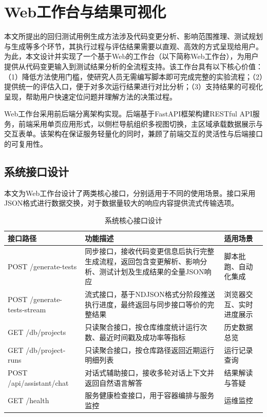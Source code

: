 \section{Web工作台与结果可视化}
\label{sec:web-workbench}

本文所提出的回归测试用例生成方法涉及代码变更分析、影响范围推理、测试规划与生成等多个环节，其执行过程与评估结果需要以直观、高效的方式呈现给用户。为此，本文设计并实现了一个基于Web的工作台（以下简称Web工作台），为用户提供从代码变更输入到测试结果分析的全流程支持。该工作台具有以下核心价值：（1）降低方法使用门槛，使研究人员无需编写脚本即可完成完整的实验流程；（2）提供统一的评估入口，便于对多次运行结果进行对比分析；（3）支持结果的可视化呈现，帮助用户快速定位问题并理解方法的决策过程。

Web工作台采用前后端分离架构实现。后端基于FastAPI框架构建RESTful API服务，前端采用单页应用形式，以侧栏导航组织多视图切换，主区域承载数据展示与交互表单。该架构在保证服务轻量化的同时，兼顾了前端交互的灵活性与后端接口的可复用性。

\subsection{系统接口设计}
\label{sec:interface-design}

本文为Web工作台设计了两类核心接口，分别适用于不同的使用场景。接口采用JSON格式进行数据交换，对于数据量较大的响应内容提供流式传输选项。

\begin{table}[htbp]
\centering
\caption{系统核心接口设计}
\label{tab:api-interfaces}
\begin{tabular}{@{}>{\raggedright\arraybackslash}p{3.6cm}>{\raggedright\arraybackslash}p{5.8cm}>{\raggedright\arraybackslash}p{4.4cm}@{}}
\toprule
接口路径 & 功能描述 & 适用场景 \\
\midrule
POST /generate-tests & 同步接口，接收代码变更信息后执行完整生成流程，返回包含变更解析、影响分析、测试计划及生成结果的全量JSON响应 & 脚本批跑、自动化集成 \\
POST /generate-tests-stream & 流式接口，基于NDJSON格式分阶段推送执行进度，最终返回与同步接口等价的完整结果 & 浏览器交互、实时进度展示 \\
GET /db/projects & 只读聚合接口，按仓库维度统计运行次数、最近时间戳及成功率等指标 & 历史数据总览 \\
GET /db/project-runs & 只读聚合接口，按仓库路径返回近期运行明细列表 & 运行记录查询 \\
POST /api/assistant/chat & 对话式辅助接口，接收多轮对话上下文并返回自然语言解答 & 结果解读与答疑 \\
GET /health & 服务健康检查接口，用于容器编排与服务监控 & 运维监控 \\
\bottomrule
\end{tabular}
\end{table}

